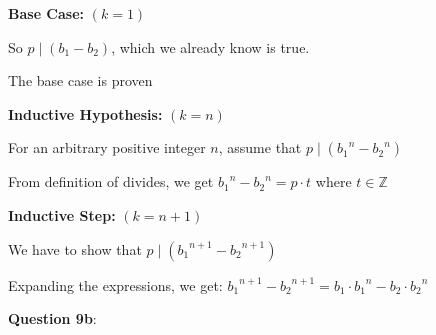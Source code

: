 \documentclass{article} %
\newcommand{\question}[2][]{\begin{flushleft}
        \textbf{Question #1}: #2

\end{flushleft}}
\begin{document}
    \tabto{1cm} \textbf{Base Case:} $(k = 1)$

    \tabto{1.5cm} So $p \mid (b_1 - b_2)$, which we already know is true.

    \tabto{1.5cm} The base case is proven

    \tabto{1cm} \textbf{Inductive Hypothesis:} $(k = n)$

    \tabto{1.5cm} For an arbitrary positive integer $n$, assume that  $p \mid ({b_1}^n - {b_2}^n)$

    \tabto{1.5cm} From definition of divides, we get ${b_1}^n - {b_2}^n = p \cdot t$ where $t \in \mathbb{Z}$

    \tabto{1cm} \textbf{Inductive Step:} $(k = n + 1)$

    \tabto{1.5cm} We have to show that $p \mid ({b_1}^{n + 1} - {b_2}^{n + 1})$

    \tabto{1.5cm} Expanding the expressions, we get: ${b_1}^{n + 1} - {b_2}^{n + 1} = b_1 \cdot {b_1}^n - b_2 \cdot {b_2}^n$

    \tabto{1.5cm} 

    \newpage

    \question[9b]{}
\end{document}
